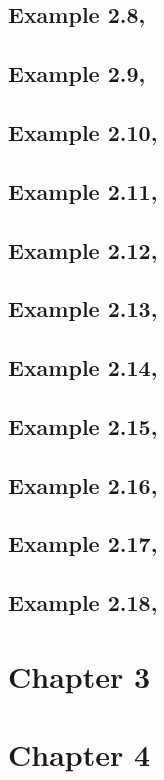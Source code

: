 \documentclass{article}\usepackage[]{graphicx}\usepackage[]{color}
\begin{document}
\subsection{Example 2.8, }
\subsection{Example 2.9, }
\subsection{Example 2.10, }
\subsection{Example 2.11, }
\subsection{Example 2.12, }
\subsection{Example 2.13, }
\subsection{Example 2.14, }
\subsection{Example 2.15, }
\subsection{Example 2.16, }
\subsection{Example 2.17, }
\subsection{Example 2.18, }

\section{Chapter 3}



\section{Chapter 4}
\end{document}
